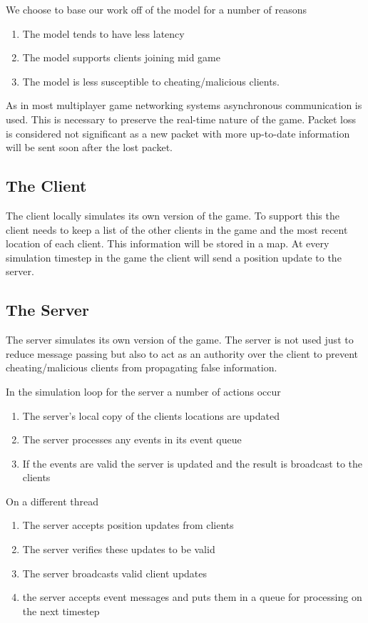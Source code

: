 	We choose to base our work off of the \clientServer model for a number of reasons
	\begin{enumerate}
		\item The \clientServer model tends to have less latency
		\item The \clientServer model supports clients joining mid game
		\item The \clientServer model is less susceptible to cheating/malicious clients.
	\end{enumerate}
	
	As in most multiplayer game networking systems asynchronous communication is used. This is necessary to preserve the real-time nature of the game. Packet loss is considered not significant as a new packet with more up-to-date information will be sent soon after the lost packet.
	
\subsection{The Client}

	The client locally simulates its own version of the game. To support this the client needs to keep a list of the other clients in the game and the most recent location of each client. This information will be stored in a map. At every simulation timestep in the game the client will send a position update to the server.
	
\subsection{The Server}

	The server simulates its own version of the game. The server is not used just to reduce message passing but also to act as an authority over the client to prevent cheating/malicious clients from propagating false information.
	
	In the simulation loop for the server a number of actions occur
	\begin{enumerate}
		\item The server's local copy of the clients locations are updated
		\item The server processes any events in its event queue
		\item If the events are valid the server is updated and the result is broadcast to the clients
	\end{enumerate}
	On a different thread
	\begin{enumerate}
		\item The server accepts position updates from clients
		\item The server verifies these updates to be valid
		\item The server broadcasts valid client updates
		\item the server accepts event messages and puts them in a queue for processing on the next timestep
	\end{enumerate}
	
